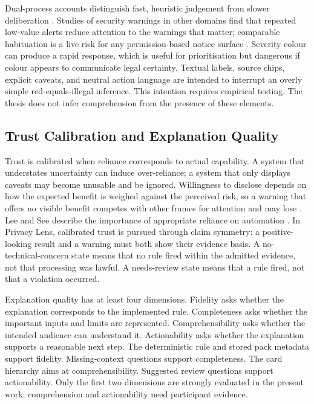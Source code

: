 Dual-process accounts distinguish fast, heuristic judgement from slower deliberation \cite{kahneman2011}. Studies of security warnings in other domains find that repeated low-value alerts reduce attention to the warnings that matter; comparable habituation is a live risk for any permission-based notice surface \cite{sunshine2009cryingwolf,bravolillo2013attention}. Severity colour can produce a rapid response, which is useful for prioritisation but dangerous if colour appears to communicate legal certainty. Textual labels, source chips, explicit caveats, and neutral action language are intended to interrupt an overly simple red-equals-illegal inference. This intention requires empirical testing. The thesis does not infer comprehension from the presence of these elements.

\subsection{Trust Calibration and Explanation Quality}

Trust is calibrated when reliance corresponds to actual capability. A system that understates uncertainty can induce over-reliance; a system that only displays caveats may become unusable and be ignored. Willingness to disclose depends on how the expected benefit is weighed against the perceived risk, so a warning that offers no visible benefit competes with other frames for attention and may lose \cite{dinev2006}. Lee and See describe the importance of appropriate reliance on automation \cite{lee2004}. In Privacy Lens, calibrated trust is pursued through claim symmetry: a positive-looking result and a warning must both show their evidence basis. A no-technical-concern state means that no rule fired within the admitted evidence, not that processing was lawful. A needs-review state means that a rule fired, not that a violation occurred.

Explanation quality has at least four dimensions. Fidelity asks whether the explanation corresponds to the implemented rule. Completeness asks whether the important inputs and limits are represented. Comprehensibility asks whether the intended audience can understand it. Actionability asks whether the explanation supports a reasonable next step. The deterministic rule and stored pack metadata support fidelity. Missing-context questions support completeness. The card hierarchy aims at comprehensibility. Suggested review questions support actionability. Only the first two dimensions are strongly evaluated in the present work; comprehension and actionability need participant evidence.

